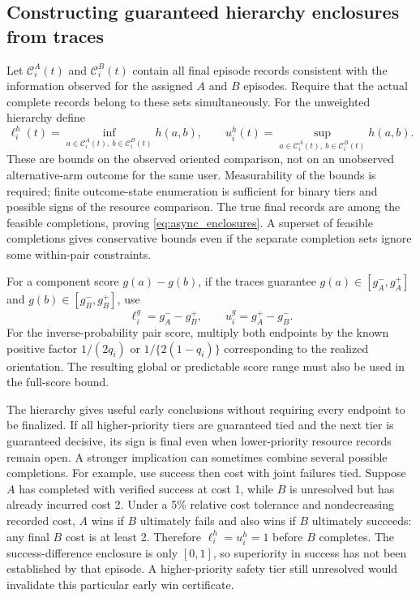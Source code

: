 \subsection{Constructing guaranteed hierarchy enclosures from traces}

Let $\mathcal C_i^A(t)$ and $\mathcal C_i^B(t)$ contain all final
episode records consistent with the information observed for the assigned
$A$ and $B$ episodes. Require that the actual complete records belong
to these sets simultaneously. For the unweighted hierarchy define
\begin{equation}
 \ell_i^h(t)=\inf_{a\in\mathcal C_i^A(t),\ b\in\mathcal C_i^B(t)}h(a,b),
 \qquad
 u_i^h(t)=\sup_{a\in\mathcal C_i^A(t),\ b\in\mathcal C_i^B(t)}h(a,b).
 \label{eq:async_kernel_set}
\end{equation}
These are bounds on the observed oriented comparison, not on an
unobserved alternative-arm outcome for the same user. Measurability of
the bounds is required; finite outcome-state enumeration is sufficient
for binary tiers and possible signs of the resource comparison. The
true final records are among the feasible completions, proving
\eqref{eq:async_enclosures}. A superset of feasible completions gives
conservative bounds even if the separate completion sets ignore some
within-pair constraints.

For a component score $g(a)-g(b)$, if the traces guarantee
$g(a)\in[g_A^-,g_A^+]$ and $g(b)\in[g_B^-,g_B^+]$, use
\[
 \ell_i^g=g_A^- -g_B^+,\qquad
 u_i^g=g_A^+ -g_B^-.
\]
For the inverse-probability pair score, multiply both endpoints by the
known positive factor $1/(2q_i)$ or $1/\{2(1-q_i)\}$ corresponding to
the realized orientation. The resulting global or predictable score
range must also be used in the full-score bound.

The hierarchy gives useful early conclusions without requiring every
endpoint to be finalized. If all higher-priority tiers are guaranteed
tied and the next tier is guaranteed decisive, its sign is final even
when lower-priority resource records remain open. A stronger implication
can sometimes combine several possible completions. For example, use
success then cost with joint failures tied. Suppose $A$ has completed
with verified success at cost 1, while $B$ is unresolved but has already
incurred cost 2. Under a 5\% relative cost tolerance and nondecreasing
recorded cost, $A$ wins if $B$ ultimately fails and also wins if $B$
ultimately succeeds: any final $B$ cost is at least 2. Therefore
$\ell_i^h=u_i^h=1$ before $B$ completes. The success-difference enclosure
is only $[0,1]$, so superiority in success has not been established by
that episode. A higher-priority safety tier still unresolved would
invalidate this particular early win certificate.

